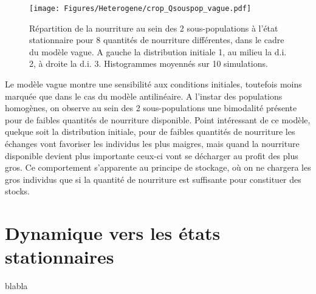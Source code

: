 \begin{figure}[h!]
\centering
\texttt{[image: Figures/Heterogene/crop\_Qsouspop\_vague.pdf]}
\caption{Répartition de la nourriture au sein des 2 sous-populations à l'état stationnaire pour 8 quantités de nourriture différentes, dans le cadre du modèle vague. A gauche la distribution initiale 1, au milieu la d.i. 2, à droite la d.i. 3. Histogrammes moyennés sur 10 simulations.}
\label{Qsouspop_vague}
\end{figure}

Le modèle vague montre une sensibilité aux conditions initiales, toutefois moins marquée que dans le cas du modèle antilinéaire. A l'instar des populations homogènes, on observe au sein des 2 sous-populations une bimodalité présente pour de faibles quantités de nourriture disponible. Point intéressant de ce modèle, quelque soit la distribution initiale, pour de faibles quantités de nourriture les échanges vont favoriser les individus les plus maigres, mais quand la nourriture disponible devient plus importante ceux-ci vont se décharger au profit des plus gros. Ce comportement s'apparente au principe de stockage, où on ne chargera les gros individus que si la quantité de nourriture est suffisante pour constituer des stocks.

\section{Dynamique vers les états stationnaires}

blabla